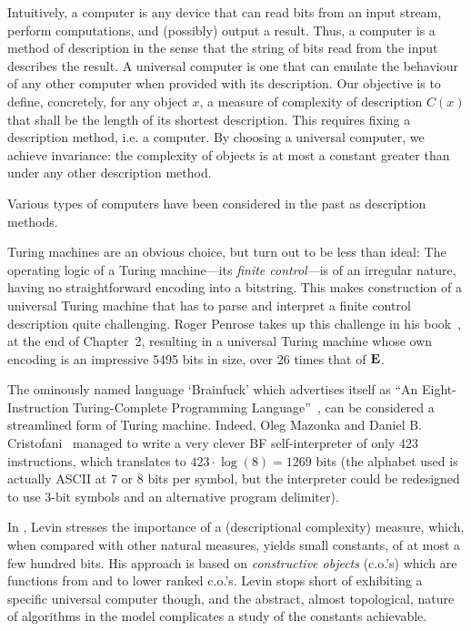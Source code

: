 \documentclass{article}
\newcommand{\CE}{{\bf E}}
\begin{document}
Intuitively, a computer is any device that can read bits from an input stream,
perform computations, and (possibly) output a result.
Thus, a computer is a method of description in the sense that the string
of bits read from the input describes the result.
A universal computer
is one that can emulate the behaviour of any other computer when
provided with its description.
Our objective is to define, concretely, for any object $x$,
a measure of complexity of description $C(x)$ that shall be the length
of its shortest description. This requires
fixing a description method, i.e. a computer.
By choosing a universal computer, we achieve invariance: the complexity
of objects is at most a constant greater than under any other description
method.

Various types of computers have been considered in the past as
description methods.

Turing machines are an obvious choice, but turn out to be less than ideal:
The operating logic of a Turing machine---its {\em finite control}---is
of an irregular nature, having no straightforward encoding into a bitstring.
This makes construction of a universal Turing machine that has to parse and
interpret a finite control description quite challenging.
Roger Penrose takes up this challenge in his book~\cite{pen},
at the end of Chapter~2, resulting in a 
universal Turing machine whose own encoding is an impressive 5495 bits in size,
over 26 times that of $\CE$.

The ominously named language `Brainfuck' which advertises itself as
``An Eight-Instruction Turing-Complete Programming Language''~\cite{bf},
can be considered a streamlined form of Turing machine. Indeed,
Oleg Mazonka and Daniel B. Cristofani~\cite{mc} managed to write a very clever
BF self-interpreter of only 423 instructions, which translates to
$423 \cdot \log(8)=1269$ bits
(the alphabet used is actually ASCII at 7 or 8 bits per symbol,
but the interpreter could be redesigned to use 3-bit symbols
and an alternative program delimiter).

In \cite{lev}, Levin stresses the importance of a (descriptional complexity)
measure, which, when
compared with other natural measures, yields small
constants, of at most a few hundred bits. His approach is based on
{\em constructive objects} (c.o.'s) which are functions from and to
lower ranked c.o.'s. Levin stops short of exhibiting a specific
universal computer though, and the abstract, almost topological,
nature of algorithms in the model complicates a study of the constants
achievable.
\end{document}
